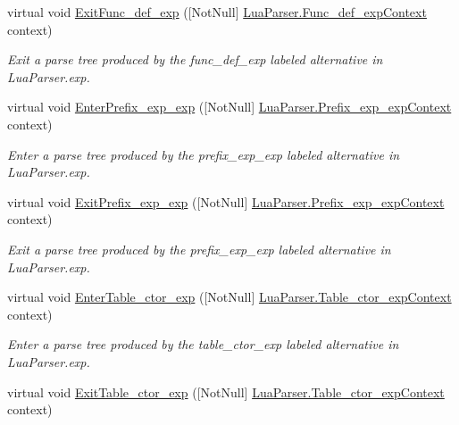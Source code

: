 \begin{DoxyCompactItemize}
virtual void \mbox{\hyperlink{classzlua_1_1_lua_base_listener_a7826a6c13bab904e4525274152d85550}{Exit\+Func\+\_\+def\+\_\+exp}} (\mbox{[}Not\+Null\mbox{]} \mbox{\hyperlink{classzlua_1_1_lua_parser_1_1_func__def__exp_context}{Lua\+Parser.\+Func\+\_\+def\+\_\+exp\+Context}} context)
\begin{DoxyCompactList}\small\item\em Exit a parse tree produced by the {\ttfamily func\+\_\+def\+\_\+exp} labeled alternative in Lua\+Parser.\+exp. \end{DoxyCompactList}\item 
virtual void \mbox{\hyperlink{classzlua_1_1_lua_base_listener_aa1c31e6fda9d54bd984d3d5d5c0ff8ed}{Enter\+Prefix\+\_\+exp\+\_\+exp}} (\mbox{[}Not\+Null\mbox{]} \mbox{\hyperlink{classzlua_1_1_lua_parser_1_1_prefix__exp__exp_context}{Lua\+Parser.\+Prefix\+\_\+exp\+\_\+exp\+Context}} context)
\begin{DoxyCompactList}\small\item\em Enter a parse tree produced by the {\ttfamily prefix\+\_\+exp\+\_\+exp} labeled alternative in Lua\+Parser.\+exp. \end{DoxyCompactList}\item 
virtual void \mbox{\hyperlink{classzlua_1_1_lua_base_listener_a7127f827c3355d3bac100faa365ffa5b}{Exit\+Prefix\+\_\+exp\+\_\+exp}} (\mbox{[}Not\+Null\mbox{]} \mbox{\hyperlink{classzlua_1_1_lua_parser_1_1_prefix__exp__exp_context}{Lua\+Parser.\+Prefix\+\_\+exp\+\_\+exp\+Context}} context)
\begin{DoxyCompactList}\small\item\em Exit a parse tree produced by the {\ttfamily prefix\+\_\+exp\+\_\+exp} labeled alternative in Lua\+Parser.\+exp. \end{DoxyCompactList}\item 
virtual void \mbox{\hyperlink{classzlua_1_1_lua_base_listener_ae6df0ff428e128a61cef144061a8747b}{Enter\+Table\+\_\+ctor\+\_\+exp}} (\mbox{[}Not\+Null\mbox{]} \mbox{\hyperlink{classzlua_1_1_lua_parser_1_1_table__ctor__exp_context}{Lua\+Parser.\+Table\+\_\+ctor\+\_\+exp\+Context}} context)
\begin{DoxyCompactList}\small\item\em Enter a parse tree produced by the {\ttfamily table\+\_\+ctor\+\_\+exp} labeled alternative in Lua\+Parser.\+exp. \end{DoxyCompactList}\item 
virtual void \mbox{\hyperlink{classzlua_1_1_lua_base_listener_ac8f2cae2546480b3e82b85cd55a7258e}{Exit\+Table\+\_\+ctor\+\_\+exp}} (\mbox{[}Not\+Null\mbox{]} \mbox{\hyperlink{classzlua_1_1_lua_parser_1_1_table__ctor__exp_context}{Lua\+Parser.\+Table\+\_\+ctor\+\_\+exp\+Context}} context)

\end{DoxyCompactItemize}
